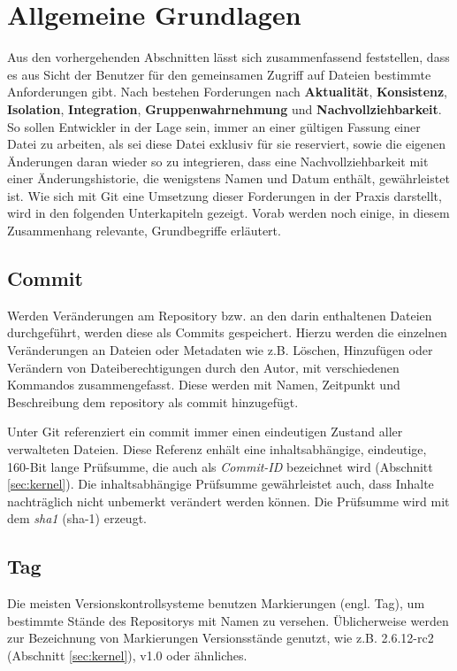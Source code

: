 \section{Allgemeine Grundlagen}\label{sec:Grundlagen}
Aus den vorhergehenden Abschnitten lässt sich zusammenfassend feststellen, dass
es aus Sicht der Benutzer für den gemeinsamen Zugriff auf Dateien bestimmte
Anforderungen gibt. Nach \cite[S.~37]{hagen:1678} bestehen Forderungen nach
\textbf{Aktualität}, \textbf{Konsistenz}, \textbf{Isolation},
\textbf{Integration}, \textbf{Gruppenwahrnehmung} und
\textbf{Nachvollziehbarkeit}. So sollen Entwickler in der Lage sein, immer an
einer gültigen Fassung einer Datei zu arbeiten, als sei diese Datei exklusiv für
sie reserviert, sowie die eigenen Änderungen daran wieder so zu integrieren, dass
eine Nachvollziehbarkeit mit einer Änderungshistorie, die wenigstens Namen und
Datum enthält, gewährleistet ist. Wie sich mit Git eine Umsetzung dieser
Forderungen in der Praxis darstellt, wird in den folgenden Unterkapiteln
gezeigt. Vorab werden noch einige, in diesem Zusammenhang relevante,
Grundbegriffe erläutert.

\subsection{Commit}\label{sec:commit}
Werden Veränderungen am Repository bzw. an den darin enthaltenen
Dateien durchgeführt, werden diese als Commits gespeichert. Hierzu werden die einzelnen
Veränderungen an Dateien oder Metadaten wie z.B. Löschen, Hinzufügen oder Verändern
von Dateiberechtigungen durch den Autor, mit verschiedenen Kommandos
zusammengefasst. Diese werden mit Namen, Zeitpunkt und Beschreibung dem
\gls{repository} als \gls{commit} hinzugefügt. \cite[S.~20]{gitosp}

Unter Git referenziert ein \gls{commit} immer einen eindeutigen Zustand aller
verwalteten Dateien. Diese Referenz enhält eine inhaltsabhängige, eindeutige,
160-Bit lange Prüfsumme, die auch als \textit{Commit-ID} bezeichnet
wird (Abschnitt \ref{sec:kernel}). Die inhaltsabhängige Prüfsumme gewährleistet
auch, dass Inhalte nachträglich nicht unbemerkt verändert werden können. Die
Prüfsumme wird mit dem \textit{\gls{sha1}} (\acrshort{sha-1})
erzeugt. \cite[S.~20-21]{gitosp}

\subsection{Tag}\label{sec:tag}
Die meisten Versionskontrollsysteme benutzen Markierungen (engl. Tag), um
bestimmte Stände des Repositorys mit Namen zu versehen. Üblicherweise werden
zur Bezeichnung von Markierungen Versionsstände genutzt, wie z.B.
2.6.12-rc2 (Abschnitt \ref{sec:kernel}), v1.0 oder ähnliches. \cite[S.~48]{progit}

